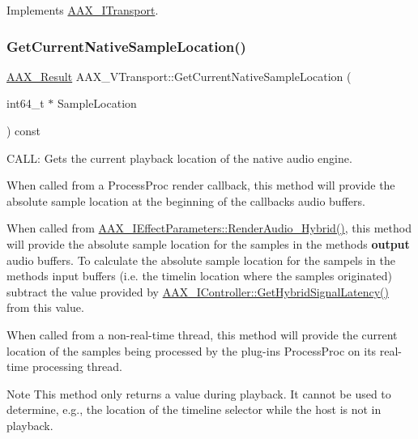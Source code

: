 Implements \mbox{\hyperlink{a01885_a386bade7d8902130a02c6e6dc8b2123b}{A\+A\+X\+\_\+\+I\+Transport}}.

\mbox{\label{a01941_ac15e5401cc221dd76f5a1260b6014148}} 
\subsubsection{\texorpdfstring{GetCurrentNativeSampleLocation()}{GetCurrentNativeSampleLocation()}}
{\footnotesize\ttfamily \mbox{\hyperlink{a00392_a4d8f69a697df7f70c3a8e9b8ee130d2f}{A\+A\+X\+\_\+\+Result}} A\+A\+X\+\_\+\+V\+Transport\+::\+Get\+Current\+Native\+Sample\+Location (\begin{DoxyParamCaption}\item[{int64\+\_\+t $\ast$}]{Sample\+Location }\end{DoxyParamCaption}) const\hspace{0.3cm}{\ttfamily [virtual]}}



C\+A\+LL\+: Gets the current playback location of the native audio engine. 

When called from a Process\+Proc render callback, this method will provide the absolute sample location at the beginning of the callback\textquotesingle{}s audio buffers.

When called from \mbox{\hyperlink{a00805_gae6139041de22f51f3146d26a01c54c1b}{A\+A\+X\+\_\+\+I\+Effect\+Parameters\+::\+Render\+Audio\+\_\+\+Hybrid()}}, this method will provide the absolute sample location for the samples in the method\textquotesingle{}s {\bfseries{output}} audio buffers. To calculate the absolute sample location for the sampels in the method\textquotesingle{}s input buffers (i.\+e. the timelin location where the samples originated) subtract the value provided by \mbox{\hyperlink{a00805_ga47b471c438fcad0798964b860d74609e}{A\+A\+X\+\_\+\+I\+Controller\+::\+Get\+Hybrid\+Signal\+Latency()}} from this value.

When called from a non-\/real-\/time thread, this method will provide the current location of the samples being processed by the plug-\/in\textquotesingle{}s Process\+Proc on its real-\/time processing thread.

\begin{DoxyNote}{Note}
This method only returns a value during playback. It cannot be used to determine, e.\+g., the location of the timeline selector while the host is not in playback.
\end{DoxyNote}

